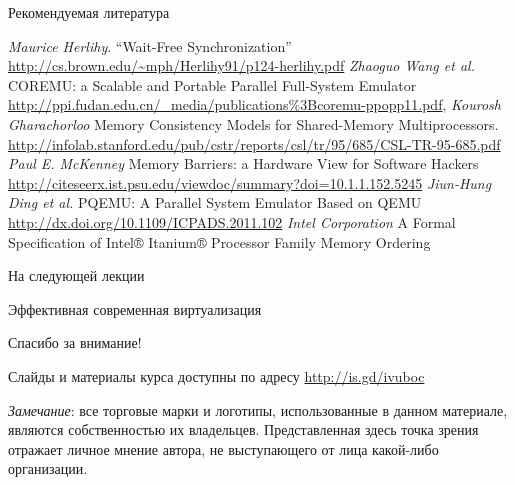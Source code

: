 \documentclass{beamer}
\begin{document}
\begin{frame}[allowframebreaks]{Рекомендуемая литература}
\begin{thebibliography}{99}
     \textit{Maurice Herlihy}. “Wait-Free Synchronization” \url{http://cs.brown.edu/~mph/Herlihy91/p124-herlihy.pdf}
     \textit{Zhaoguo Wang et al.} COREMU: a Scalable and Portable Parallel Full-System Emulator \url{http://ppi.fudan.edu.cn/_media/publications\%3Bcoremu-ppopp11.pdf},
     \textit{Kourosh Gharachorloo} Memory Consistency Models for Shared-Memory Multiprocessors. \url{http://infolab.stanford.edu/pub/cstr/reports/csl/tr/95/685/CSL-TR-95-685.pdf}
     \textit{Paul E. McKenney} Memory Barriers: a Hardware View for Software Hackers \url{http://citeseerx.ist.psu.edu/viewdoc/summary?doi=10.1.1.152.5245}
     \textit{Jiun-Hung Ding et al.} PQEMU: A Parallel System Emulator Based on QEMU \url{http://dx.doi.org/10.1109/ICPADS.2011.102}
     \textit{Intel Corporation} A Formal Specification of {Intel}® {Itanium}® Processor Family Memory Ordering
\end{thebibliography}
\end{frame}


\begin{frame}{На следующей лекции}
\centering

Эффективная современная виртуализация

\end{frame}


\begin{frame}

{\huge{Спасибо за внимание!}\par}

\vfill

Слайды и материалы курса доступны по адресу \url{http://is.gd/ivuboc} %

\vfill

\tiny{\textit{Замечание}: все торговые марки и логотипы, использованные в данном материале, являются собственностью их владельцев. Представленная здесь точка зрения отражает личное мнение автора, не выступающего от лица какой-либо организации.}

\end{frame}
\end{document}
